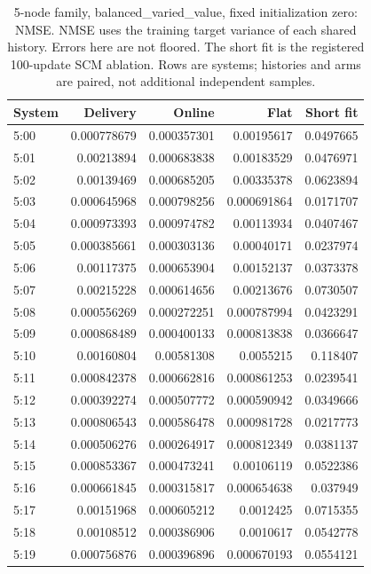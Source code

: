 \begin{table}[ht]
\centering\scriptsize
\begin{tabular}{lrrrr}
\toprule
System & Delivery & Online & Flat & Short fit\\
\midrule
5:00 & 0.000778679 & 0.000357301 & 0.00195617 & 0.0497665\\
5:01 & 0.00213894 & 0.000683838 & 0.00183529 & 0.0476971\\
5:02 & 0.00139469 & 0.000685205 & 0.00335378 & 0.0623894\\
5:03 & 0.000645968 & 0.000798256 & 0.000691864 & 0.0171707\\
5:04 & 0.000973393 & 0.000974782 & 0.00113934 & 0.0407467\\
5:05 & 0.000385661 & 0.000303136 & 0.00040171 & 0.0237974\\
5:06 & 0.00117375 & 0.000653904 & 0.00152137 & 0.0373378\\
5:07 & 0.00215228 & 0.000614656 & 0.00213676 & 0.0730507\\
5:08 & 0.000556269 & 0.000272251 & 0.000787994 & 0.0423291\\
5:09 & 0.000868489 & 0.000400133 & 0.000813838 & 0.0366647\\
5:10 & 0.00160804 & 0.00581308 & 0.0055215 & 0.118407\\
5:11 & 0.000842378 & 0.000662816 & 0.000861253 & 0.0239541\\
5:12 & 0.000392274 & 0.000507772 & 0.000590942 & 0.0349666\\
5:13 & 0.000806543 & 0.000586478 & 0.000981728 & 0.0217773\\
5:14 & 0.000506276 & 0.000264917 & 0.000812349 & 0.0381137\\
5:15 & 0.000853367 & 0.000473241 & 0.00106119 & 0.0522386\\
5:16 & 0.000661845 & 0.000315817 & 0.000654638 & 0.037949\\
5:17 & 0.00151968 & 0.000605212 & 0.0012425 & 0.0715355\\
5:18 & 0.00108512 & 0.000386906 & 0.0010617 & 0.0542778\\
5:19 & 0.000756876 & 0.000396896 & 0.000670193 & 0.0554121\\
\bottomrule
\end{tabular}
\caption{5-node family, balanced\_varied\_value, fixed initialization zero: NMSE. NMSE uses the training target variance of each shared history. Errors here are not floored. The short fit is the registered 100-update SCM ablation. Rows are systems; histories and arms are paired, not additional independent samples.}
\end{table}
